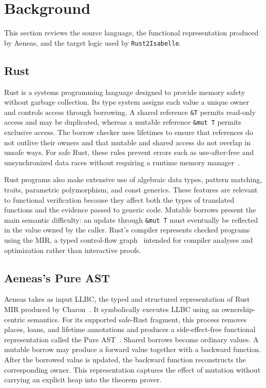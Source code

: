 \section{Background}
\label{sec:background}

This section reviews the source language, the functional representation produced by Aeneas, and the target logic used by \texttt{Rust2Isabelle}.

\subsection{Rust}

Rust is a systems programming language designed to provide memory safety
without garbage collection. Its type system assigns each value a unique
owner and controls access through borrowing.
A shared reference \texttt{\&T} permits read-only access and may be duplicated, whereas a mutable reference \texttt{\&mut T} permits exclusive access.
The borrow checker uses lifetimes to ensure that references do not outlive their owners and that mutable and shared access do not overlap in unsafe ways.
For safe Rust, these rules prevent errors such as use-after-free and unsynchronized data races without requiring a runtime memory manager~\cite{jung2017rustbelt}.

Rust programs also make extensive use of algebraic data types, pattern matching, traits, parametric polymorphism, and const generics.
These features are relevant to functional verification because they affect both the types of translated functions and the evidence passed to generic code.
Mutable borrows present the main semantic difficulty: an update through \texttt{\&mut T} must eventually be reflected in the value owned by the caller.
Rust's compiler represents checked programs using the MIR, a typed control-flow graph~\cite{rustc-mir} intended for compiler analyses and optimization rather than interactive proofs.

\subsection{Aeneas's Pure AST}

Aeneas takes as input LLBC, the typed and structured representation of Rust MIR produced by Charon~\cite{ho2025charon}. It symbolically executes LLBC using an ownership-centric semantics.
For its supported safe-Rust fragment, this process removes places, loans, and lifetime annotations and produces a side-effect-free functional representation called the Pure AST~\cite{ho2022aeneas}.
Shared borrows become ordinary values. A mutable borrow may produce a forward value together with a backward function.
After the borrowed value is updated, the backward function reconstructs the corresponding owner.
This representation captures the effect of mutation without carrying an explicit heap into the theorem prover.

